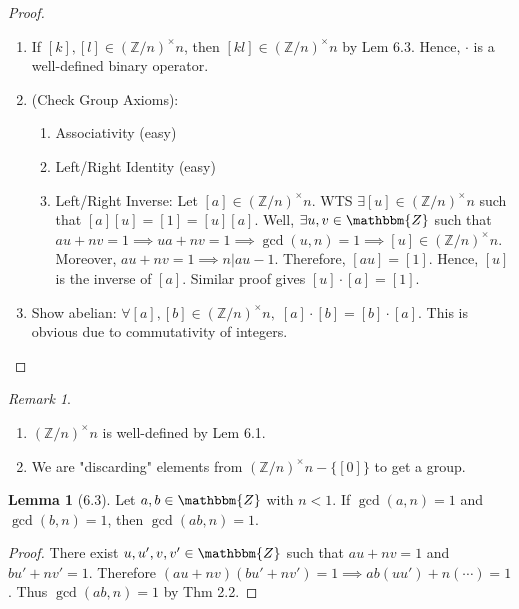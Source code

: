 \documentclass{article}
\newcommand{\Z}{\mathbbm{Z}}
\theoremstyle{definition}
\newtheorem*{lem}{Lemma}
\theoremstyle{remark}
\newtheorem*{rmk}{Remark}
\newcommand{\Znx}{(\mathbb{Z}/n)^\times}
\begin{document}
{{        \begin{proof}\hfill
            \begin{enumerate}
                \item If $[k],[l] \in \Znx{n}$, then $[kl] \in \Znx{n}$ by Lem 6.3. Hence, $\cdot$ is a well-defined binary operator.
                \item (Check Group Axioms):
                    \begin{enumerate}
                        \item Associativity (easy)
                        \item Left/Right Identity (easy)
                        \item Left/Right Inverse: Let $[a] \in \Znx{n}$. WTS $\exists [u] \in \Znx{n}$ such that $[a][u]=[1]=[u][a]$. Well, $\exists u,v \in \Z$ such that $au+nv=1 \implies ua+nv=1 \implies \gcd(u,n)=1 \implies [u] \in \Znx{n}$. Moreover, $au+nv=1 \implies n|au-1$. Therefore, $[au]=[1]$. Hence, $[u]$ is the inverse of $[a]$. Similar proof gives $[u]\cdot[a]=[1]$.
                    \end{enumerate}
                \item Show abelian: $\forall [a],[b] \in \Znx{n}, \; [a]\cdot[b]=[b]\cdot[a]$. This is obvious due to commutativity of integers.
            \end{enumerate}
        \end{proof}
        
        \begin{rmk}\hfill
            \begin{enumerate}
                \item $\Znx{n}$ is well-defined by Lem 6.1.
                \item We are "discarding" elements from $\Znx{n}-\{[0]\}$ to get a group.
            \end{enumerate}
        \end{rmk}
        
        \begin{lem}[6.3]
            Let $a,b \in \Z$ with $n<1$. If $\gcd(a,n)=1$ and $\gcd(b,n)=1$, then $\gcd(ab,n)=1$.
        \end{lem}
        
        \begin{proof}
            There exist $u,u',v,v' \in \Z$ such that $au+nv=1$ and $bu'+nv'=1$. Therefore $(au+nv)(bu'+nv')=1 \implies ab(uu')+n(\cdots)=1$. Thus $\gcd(ab,n)=1$ by Thm 2.2.
        \end{proof}
        
}}
\end{document}
